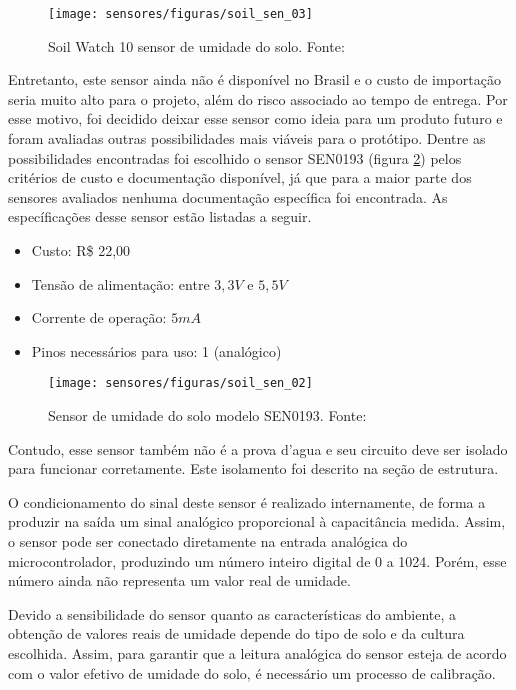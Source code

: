 	\begin{figure}[H]
			\centering
			\texttt{[image: sensores/figuras/soil\_sen\_03]}
			\caption{Soil Watch 10 sensor de umidade do solo. Fonte: \cite{bib_soil_sen_03}}
			\label{soil_sen_03}
		\end{figure}	

		Entretanto, este sensor ainda não é disponível no Brasil e o custo de importação seria muito alto para o projeto, além do risco associado ao tempo de entrega. Por esse motivo, foi decidido deixar esse sensor como ideia para um produto futuro e foram avaliadas outras possibilidades mais viáveis para o protótipo. Dentre as possibilidades encontradas foi escolhido o sensor SEN0193 (figura \ref{soil_sen_02}) pelos critérios de custo e documentação disponível, já que para a maior parte dos sensores avaliados nenhuma documentação específica foi encontrada. As específicações desse sensor estão listadas a seguir.
		
		\begin{itemize}
					\item Custo: R\$ 22,00
					\item Tensão de alimentação: entre $3,3V$ e $5,5V$
					\item Corrente de operação: $5 mA$
					\item Pinos necessários para uso: 1 (analógico)
		\end{itemize}
		
		\begin{figure}[H]
			\centering
			\texttt{[image: sensores/figuras/soil\_sen\_02]}
			\caption{Sensor de umidade do solo modelo SEN0193. Fonte: \cite{bib_soil_sen_02}}
			\label{soil_sen_02}
		\end{figure}	
		
		Contudo, esse sensor também não é a prova d'agua e seu circuito deve ser isolado para funcionar corretamente. Este isolamento foi descrito na seção de estrutura.

		O condicionamento do sinal deste sensor é realizado internamente, de forma a produzir na saída um sinal analógico proporcional à capacitância medida. Assim, o sensor pode ser conectado diretamente na entrada analógica do microcontrolador, produzindo um número inteiro digital de 0 a 1024. Porém, esse número ainda não representa um valor real de umidade.

		Devido a sensibilidade do sensor quanto as características do ambiente, a obtenção de valores reais de umidade depende do tipo de solo e da cultura escolhida. Assim, para garantir que a leitura analógica do sensor esteja de acordo com o valor efetivo de umidade do solo, é necessário um processo de calibração. 
		
